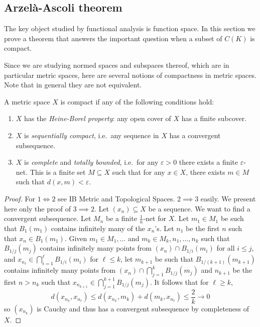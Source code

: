 \documentclass[a4paper]{article}
\begin{document}
\subsection{Arzelà-Ascoli theorem}

The key object studied by functional analysis is function space. In this section we prove a theorem that answers the important question when a subset of \(C(K)\) is compact.

Since we are studying normed spaces and subspaces thereof, which are in particular metric spaces, here are several notions of compactness in metric spaces. Note that in general they are not equivalent.

\begin{definition}
  A metric space \(X\) is compact if any of the following conditions hold:
  \begin{enumerate}
  \item \(X\) has the \emph{Heine-Borel property}: any open cover of \(X\) has a finite subcover.
  \item \(X\) is \emph{sequentially compact}, i.e.\ any sequence in \(X\) has a convergent subsequence.
  \item \(X\) is \emph{complete} and \emph{totally bounded}, i.e.\ for any \(\varepsilon > 0\) there exists a finite \(\varepsilon\)-net. This is a finite set \(M \subseteq X\) such that for any \(x \in X\), there exists \(m \in M\) such that \(d(x, m) < \varepsilon\).
  \end{enumerate}
\end{definition}

\begin{proof}
  For \(1 \iff 2\) see IB Metric and Topological Spaces. \(2 \implies 3\) easily. We present here only the proof of \(3 \implies 2\). Let \((x_n) \subseteq X\) be a sequence. We want to find a convergent subsequence. Let \(M_n\) be a finite \(\frac{1}{n}\)-net for \(X\). Let \(m_1 \in M_1\) be such that \(B_1(m_1)\) contains infinitely many of the \(x_n\)'s. Let \(n_1\) be the first \(n\) such that \(x_n \in B_1(m_1)\). Given \(m_1 \in M_1, \dots\) and \(m_k \in M_k, n_1, \dots, n_k\) such that \(B_{1/j}(m_j)\) contains infinitely many points from \((x_n) \cap B_{1/i}(m_i)\) for all \(i \leq j\), and \(x_{n_\ell} \in \bigcap_{i = 1}^\ell B_{1/i}(m_i)\) for \(\ell \leq k\), let \(m_{k + 1}\) be such that \(B_{1/(k + 1)}(m_{k + 1})\) contains infinitely many points from \((x_n) \cap \bigcap_{j = 1}^k B_{1/j}(m_j)\) and \(n_{k + 1}\) be the first \(n > n_k\) such that \(x_{n_{k + 1}} \in \bigcap_{j = 1}^{k + 1} B_{1/j}(m_j)\). It follows that for \(\ell \geq k\),
  \[
    d(x_{n_k}, x_{n_\ell}) \leq d(x_{n_k}, m_k) + d(m_k, x_{n_\ell}) \leq \frac{2}{k} \to 0
  \]
  so \((x_{n_k})\) is Cauchy and thus has a convergent subsequence by completeness of \(X\).
\end{proof}
\end{document}
